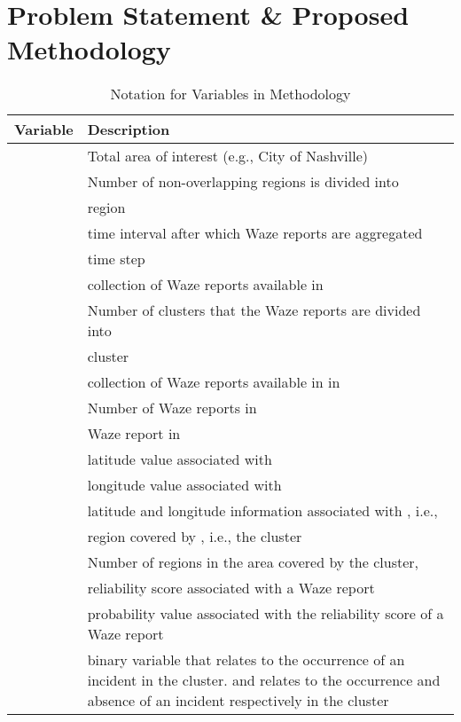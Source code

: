 \documentclass[conference]{IEEEtran}
\begin{document}
\section{Problem Statement \& Proposed Methodology}
\label{sec:method}

\begin{table}[h]
\caption{Notation for Variables in Methodology} 
    \label{tab:notation}
    \centering
    \begin{tabular}{|p{1cm}|p{6.5cm}|}
    \hline
    \textbf{Variable} & \textbf{Description} \\
    \hline
     & Total area of interest (e.g., City of Nashville)\\
    \hline
     & Number of non-overlapping regions  is divided into\\
    \hline
     &  region\\
    \hline
     & time interval after which Waze reports are aggregated\\
    \hline
     &  time step\\
    \hline
     & collection of Waze reports available in \\
    \hline
     & Number of clusters that the Waze reports are divided into\\
    \hline
     &  cluster\\
    \hline
     & collection of Waze reports available in  in \\
    \hline
     & Number of Waze reports in \\
    \hline
     &  Waze report in \\
    \hline
     & latitude value associated with \\
    \hline
      & longitude value associated with \\
    \hline
      & latitude and longitude information associated with , i.e., \\
    \hline
     &  region covered by , i.e., the  cluster\\
    \hline
     & Number of regions in the area covered by the  cluster, \\
    \hline
     & reliability score associated with a Waze report\\
    \hline
     & probability value associated with the reliability score of a Waze report\\
    \hline
     & binary variable that relates to the occurrence of an incident in the  cluster.  and  relates to the occurrence and absence of an incident respectively in the  cluster\\

\end{tabular}
\end{table}
\end{document}
